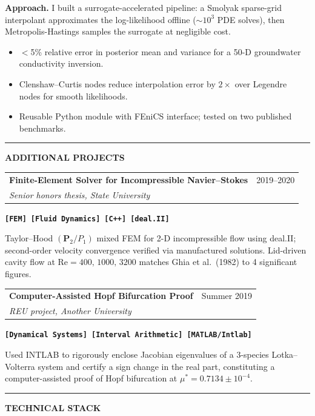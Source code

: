 \documentclass[10pt,letterpaper]{article}
\makeatletter
\newcommand{\pfsection}[1]{%
  \needspace{6\baselineskip}%
  \vspace{6pt}%
  {\color{NavyDeep}\rule{\linewidth}{0.8pt}\par}%
  \vspace{-2pt}%
  {\color{NavyDeep}\large\bfseries\MakeUppercase{#1}\par}%
  \vspace{3pt}%
}
\newcommand{\projecthead}[3]{%
  \noindent
  \begin{tabularx}{\linewidth}{@{}X r@{}}
    {\large\bfseries\color{NavyDeep}#1} & {\small\color{SubtleGray}#3}\\[-2pt]
    {\small\itshape\color{AccentTeal}#2} & \\
  \end{tabularx}%
  \vspace{2pt}%
}
\newcommand{\cvtag}[1]{%
  \mbox{\small\bfseries\color{AccentTeal}\texttt{[#1]}}\,%
}
\newcommand{\eq}[1]{$#1$}
\makeatother
\begin{document}
\textbf{Approach.}\enspace
I built a surrogate-accelerated pipeline: a Smolyak sparse-grid interpolant
approximates the log-likelihood offline (\eq{\sim 10^3} PDE solves), then
Metropolis-Hastings samples the surrogate at negligible cost.

\begin{itemize}
  \item \eq{<}5\% relative error in posterior mean and variance for a 50-D
        groundwater conductivity inversion.
  \item Clenshaw--Curtis nodes reduce interpolation error by \eq{2\times} over
        Legendre nodes for smooth likelihoods.
  \item Reusable Python module with FEniCS interface; tested on two published benchmarks.
\end{itemize}

\vspace{8pt}

\pfsection{Additional Projects}

\projecthead
  {Finite-Element Solver for Incompressible Navier--Stokes}
  {Senior honors thesis, State University}
  {2019--2020}

\noindent\cvtag{FEM} \cvtag{Fluid Dynamics} \cvtag{C++} \cvtag{deal.II}

\vspace{4pt}
Taylor--Hood \eq{(\mathbf{P}_2/P_1)} mixed FEM for 2-D incompressible flow using deal.II;
second-order velocity convergence verified via manufactured solutions.
Lid-driven cavity flow at \eq{\mathrm{Re}=400,\,1000,\,3200} matches Ghia et al.\
(1982) to 4 significant figures.

\vspace{6pt}

\projecthead
  {Computer-Assisted Hopf Bifurcation Proof}
  {REU project, Another University}
  {Summer 2019}

\noindent\cvtag{Dynamical Systems} \cvtag{Interval Arithmetic} \cvtag{MATLAB/Intlab}

\vspace{4pt}
Used INTLAB to rigorously enclose Jacobian eigenvalues of a 3-species Lotka--Volterra
system and certify a sign change in the real part, constituting a computer-assisted
proof of Hopf bifurcation at \eq{\mu^*=0.7134\pm10^{-4}}.

\vspace{6pt}

\pfsection{Technical Stack}
\end{document}
